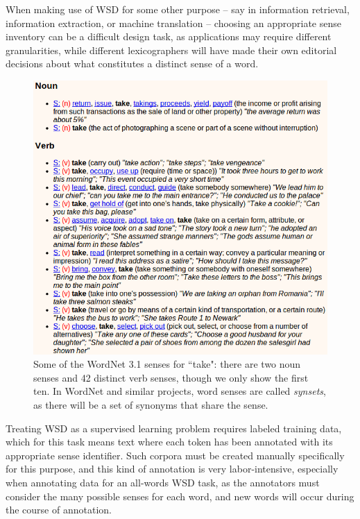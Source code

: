 When making use of WSD for some other purpose -- say in information retrieval,
information extraction, or machine translation -- choosing an appropriate sense
inventory can be a difficult design task, as applications may require different
granularities, while different lexicographers will have made their own
editorial decisions about what constitutes a distinct sense of a word.

\begin{figure}
  \includegraphics[width=12cm]{take-wordnet-31.png}
  \caption{Some of the WordNet 3.1 senses for ``take": there are two noun
  senses and 42 distinct verb senses, though we only show the first ten. In
  WordNet and similar projects, word senses are called \emph{synsets}, as there
  will be a set of synonyms that share the sense.}
  \label{fig:wordnet-senses-take}
\end{figure}

Treating WSD as a supervised learning problem requires labeled training data,
which for this task means text where each token has been annotated with its
appropriate sense identifier. 
Such corpora must be created manually specifically for this purpose, and this kind
of annotation is very labor-intensive, especially when annotating data for an
all-words WSD task, as the annotators must consider the many possible senses
for each word, and new words will occur during the course of annotation.

